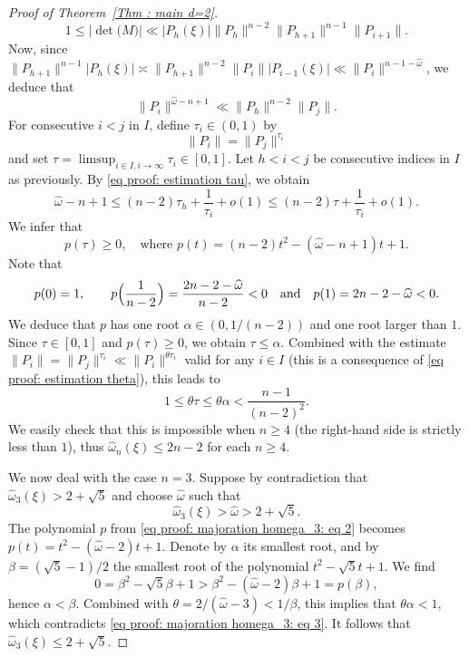 \documentclass[JEP,XML,SOM,Unicode,NoFloatCountersInSection,published]{cedram}
\newcommand\homega{\widehat{\omega}}\newcommand\HH{\mathcal{H}}
\newcommand{\normH}[1]{\|#1\|}
\newcommand\AND{\quad\text{and}\quad}
\theoremstyle{definition}
\theoremstyle{plain}
\begin{document}
\begin{proof}[Proof of Theorem~\ref{Thm : main d=2}]
\begin{equation*}
1 \leq \big|\det\big(M)\big| \ll |P_{h}(\xi)|\normH{P_{h}}^{n-2}\normH{P_{h+1}}^{n-1}\normH{P_{i+1}}.
\end{equation*}
Now, since $\normH{P_{h+1}}^{n-1}|P_{h}(\xi)| \asymp \normH{P_{h+1}}^{n-2}\normH{P_i}|P_{i-1}(\xi)| \ll \normH{P_i}^{n-1-\homega}$, we deduce that
\begin{equation}
\label{eq proof: estimation tau}
\normH{P_i}^{\homega-n+1} \ll \normH{P_{h}}^{n-2}\normH{P_{j}}.
\end{equation}
For consecutive $i<j$ in $I$, define $\tau_i\in(0,1)$ by
\[
\normH{P_i} = \normH{P_j}^{\tau_i}
\]
and set $\tau = \limsup_{i\in I, i\to\infty} \tau_i \in [0,1]$. Let $h<i<j$ be consecutive indices in $I$ as previously. By \eqref{eq proof: estimation tau}, we obtain
\[
\homega-n+1 \leq (n-2)\tau_h + \frac{1}{\tau_i} +o(1) \leq (n-2)\tau + \frac{1}{\tau_i} +o(1).
\]
We infer that
\begin{equation}
\label{eq proof: majoration homega_3: eq 2}
p(\tau) \geq 0, \quad \textrm{where } p(t) = (n-2)t^2-(\homega-n+1)t+1.
\end{equation}
Note that
\begin{equation*}
p(0) = 1, \qquad p\Bigl(\frac{1}{n-2}\Bigr) = \frac{2n-2-\homega}{n-2} < 0 \AND p(1) = 2n-2-\homega < 0.
\end{equation*}
We deduce that $p$ has one root $\alpha\in(0,1/(n-2))$ and one root larger than $1$. Since $\tau\in[0,1]$ and $p(\tau)\geq 0$, we obtain $\tau \leq \alpha$. Combined with the estimate $\normH{P_i} = \normH{P_j}^{\tau_i} \ll \normH{P_i}^{\theta\tau_i}$ valid
for any $i\in I$ (this is a consequence of \eqref{eq proof: estimation theta}), this leads to
\begin{equation}
\label{eq proof: majoration homega_3: eq 3}
1 \leq \theta\tau \leq \theta\alpha < \frac{n-1}{(n-2)^2}.
\end{equation}
We easily check that this is impossible when $n\geq 4$ (the right-hand side is strictly less than $1$), thus $\homega_n(\xi)\leq 2n-2$ for each $n\geq 4$.

We now deal with the case $n=3$. Suppose by contradiction that $\homega_3(\xi) > 2+\sqrt 5$ and choose $\homega$ such that
\[
\homega_3(\xi) > \homega > 2+\sqrt 5.
\]
The polynomial $p$ from \eqref{eq proof: majoration homega_3: eq 2} becomes $p(t) = t^2-(\homega-2)t+1$. Denote by $\alpha$ its smallest root, and by $\beta = (\sqrt 5 -1)/2$ the smallest root of the polynomial $t^2-\sqrt 5 t + 1$. We find
\begin{equation*}
0 = \beta^2-\sqrt 5 \beta + 1 > \beta^2-(\homega-2 )\beta + 1 = p(\beta),
\end{equation*}
hence $\alpha < \beta$. Combined with $\theta = 2/(\homega-3) < 1/\beta$, this implies that $\theta \alpha < 1$, which contradicts \eqref{eq proof: majoration homega_3: eq 3}. It follows that $\homega_3(\xi) \leq 2+\sqrt 5$.
\end{proof}
\end{document}
